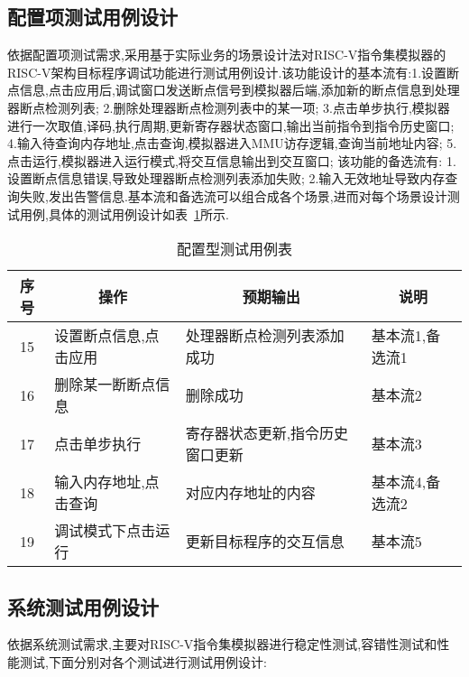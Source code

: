 \subsection{配置项测试用例设计}
依据配置项测试需求,采用基于实际业务的场景设计法对RISC-V指令集模拟器的RISC-V架构目标程序调试功能进行测试用例设计.该功能设计的基本流有:1.设置断点信息,点击应用后,调试窗口发送断点信号到模拟器后端,添加新的断点信息到处理器断点检测列表; 2.删除处理器断点检测列表中的某一项; 3.点击单步执行,模拟器进行一次取值,译码,执行周期,更新寄存器状态窗口,输出当前指令到指令历史窗口; 4.输入待查询内存地址,点击查询,模拟器进入MMU访存逻辑,查询当前地址内容; 5.点击运行,模拟器进入运行模式,将交互信息输出到交互窗口; 该功能的备选流有: 1.设置断点信息错误,导致处理器断点检测列表添加失败; 2.输入无效地址导致内存查询失败,发出告警信息.基本流和备选流可以组合成各个场景,进而对每个场景设计测试用例,具体的测试用例设计如表~\ref{tab:test5}所示.
\begin{table}[h]
    \centering
    \caption{配置型测试用例表}
    \label{tab:test5}
    \begin{tabular}{clll}
      \toprule
      \multicolumn{1}{c}{序号} & \multicolumn{1}{c}{操作} & \multicolumn{1}{c}{预期输出} &\multicolumn{1}{c}{说明}\\
      \midrule
  15	& \multicolumn{1}{m{3.5cm}}{设置断点信息,点击应用} & \multicolumn{1}{m{3.5cm}}{处理器断点检测列表添加成功} & \multicolumn{1}{m{3.5cm}}{基本流1,备选流1}\\
  \hline
  16	& \multicolumn{1}{m{3.5cm}}{删除某一断断点信息} & \multicolumn{1}{m{3.5cm}}{删除成功} & \multicolumn{1}{m{3.5cm}}{基本流2}\\
  \hline
  17	& \multicolumn{1}{m{3.5cm}}{点击单步执行} & \multicolumn{1}{m{3.5cm}}{寄存器状态更新,指令历史窗口更新} & \multicolumn{1}{m{3.5cm}}{基本流3}\\
  \hline
  18	& \multicolumn{1}{m{3.5cm}}{输入内存地址,点击查询} & \multicolumn{1}{m{3.5cm}}{对应内存地址的内容} & \multicolumn{1}{m{3.5cm}}{基本流4,备选流2}\\
  \hline
  19	& \multicolumn{1}{m{3.5cm}}{调试模式下点击运行} & \multicolumn{1}{m{3.5cm}}{更新目标程序的交互信息} & \multicolumn{1}{m{3.5cm}}{基本流5}\\
      \bottomrule
    \end{tabular}
\end{table}


\subsection{系统测试用例设计}
依据系统测试需求,主要对RISC-V指令集模拟器进行稳定性测试,容错性测试和性能测试,下面分别对各个测试进行测试用例设计:


